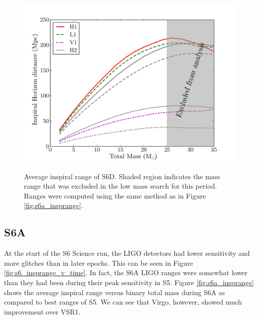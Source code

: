 \begin{figure}[p]
\begin{center}
\label{fig:s6d_insprange}
\includegraphics[width=6in]{figures/s6d_insprange_alt.pdf}
\end{center}
\caption{Average inspiral range of S6D. Shaded region indicates the mass range that was excluded in the low mass search for this period. Ranges were computed using the same method as in Figure \ref{fig:s6a_insprange}.}
\end{figure}

\subsection{S6A}
\label{sec:s6a}

At the start of the S6 Science run, the \ac{LIGO} detectors had lower
sensitivity and more glitches than in later epochs. This can be seen in Figure
\ref{fig:s6_insprange_v_time}. In fact, the S6A \ac{LIGO} ranges were somewhat
lower than they had been during their peak sensitivity in \ac{S5}. Figure
\ref{fig:s6a_insprange} shows the average inspiral range versus binary total
mass during S6A as compared to best ranges of \ac{S5}. We can see that Virgo,
however, showed much improvement over VSR1.

